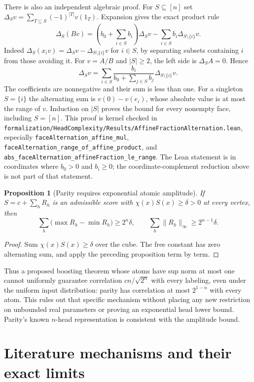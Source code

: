 \documentclass[11pt]{article}
\newtheorem{proposition}{Proposition}
\begin{document}
There is also an independent algebraic proof. For $S\subseteq[n]$ set
$\Delta_S v=\sum_{T\subseteq S}(-1)^{|T|}v(1_T)$.
Expansion gives the exact product rule
\[
 \Delta_S(Bv)=\left(b_0+\sum_{i\in S}b_i\right)\Delta_Sv
              -\sum_{i\in S}b_i\Delta_{S\setminus\{i\}}v.
\]
Indeed $\Delta_S(x_iv)=\Delta_Sv-\Delta_{S\setminus\{i\}}v$ for
$i\in S$, by separating subsets containing $i$ from those avoiding it.
For $v=A/B$ and $|S|\ge2$, the left side is $\Delta_SA=0$. Hence
\[
 \Delta_Sv=\sum_{i\in S}
 \frac{b_i}{b_0+\sum_{j\in S}b_j}\Delta_{S\setminus\{i\}}v.
\]
The coefficients are nonnegative and their sum is less than one.
For a singleton $S=\{i\}$ the alternating sum is $v(0)-v(e_i)$,
whose absolute value is at most the range of $v$. Induction on $|S|$
proves the bound for every nonempty face, including $S=[n]$.
This proof is kernel checked in
\texttt{formalization/HeadComplexity/Results/AffineFractionAlternation.lean},
especially \texttt{faceAlternation\_affine\_mul},
\texttt{faceAlternation\_range\_of\_affine\_product}, and
\texttt{abs\_faceAlternation\_affineFraction\_le\_range}.
The Lean statement is in coordinates where $b_0>0$ and $b_i\ge0$;
the coordinate-complement reduction above is not part of that statement.

\begin{proposition}[Parity requires exponential atomic amplitude]
If $S=c+\sum_hR_h$ is an admissible score with
$\chi(x)S(x)\ge\delta>0$ at every vertex, then
\[
 \sum_h\bigl(\max R_h-\min R_h\bigr)\ge 2^n\delta,
 \qquad
 \sum_h\|R_h\|_\infty\ge2^{n-1}\delta.
\]
\end{proposition}
\begin{proof}
Sum $\chi(x)S(x)\ge\delta$ over the cube. The free constant has zero
alternating sum, and apply the preceding proposition term by term.
\end{proof}

Thus a proposed boosting theorem whose atoms have sup norm at most one
cannot uniformly guarantee correlation $cn/\sqrt{2^n}$ with every
labeling, even under the uniform input distribution: parity has
correlation at most $2^{1-n}$ with every atom. This rules out that
specific mechanism without placing any new restriction on unbounded
real parameters or proving an exponential head lower bound. Parity's
known $n$-head representation is consistent with the amplitude bound.

\section{Literature mechanisms and their exact limits}
\end{document}
